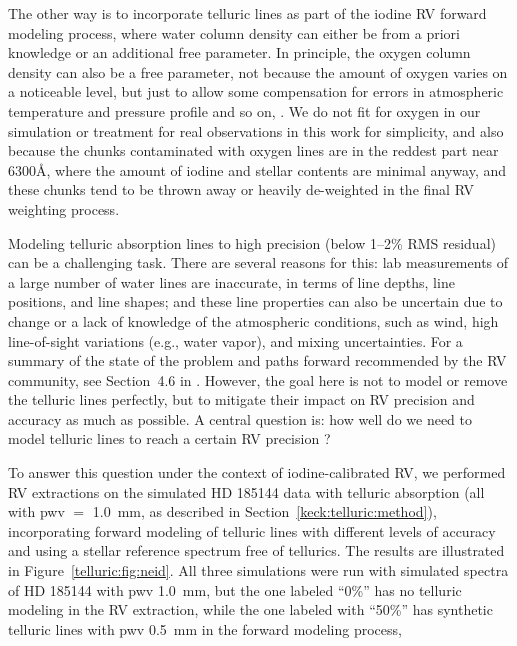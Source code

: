 The other way is to incorporate telluric lines as part of the iodine
RV forward modeling process, where water column density can either be
from a priori knowledge or an additional free parameter. In principle,
the oxygen column density can also be a free parameter, not because
the amount of oxygen varies on a noticeable level, but just to allow
some compensation for errors in atmospheric temperature and pressure
profile and so on, . We do not fit for oxygen in our simulation or treatment
for real observations in this work for simplicity, and also because
the chunks contaminated with oxygen lines are in the reddest part near
6300\AA, where the amount of iodine and stellar contents are minimal
anyway, and these chunks tend to be thrown away or heavily de-weighted
in the final RV weighting process.

Modeling telluric absorption lines to high precision (below 1--2\% RMS
residual) can be a challenging task. There are several reasons for
this: lab measurements of a large number of water lines are
inaccurate, in terms of line depths, line positions, and line shapes;
and these line properties can also be uncertain due to change or a
lack of knowledge of the atmospheric conditions, such as wind, high
line-of-sight variations (e.g., water vapor), and mixing
uncertainties. For a summary of the state of the problem and paths
forward recommended by the RV community, see Section~4.6 in
\cite{eprv2015}. However, the goal here is not to model or remove
the telluric lines perfectly, but to mitigate their impact on RV
precision and accuracy as much as possible. A central question is: how
well do we need to model telluric lines to reach a certain RV
precision \citep{eprv2015}?

To answer this question under the context of iodine-calibrated RV, we
performed RV extractions on the simulated HD 185144 data with telluric
absorption (all with pwv $=$ 1.0~mm, as described in
Section~\ref{keck:telluric:method}), incorporating forward modeling of
telluric lines with different levels of accuracy and using a stellar
reference spectrum free of tellurics. The results are illustrated in
Figure~\ref{telluric:fig:neid}. All three simulations were run with
simulated spectra of HD 185144 with pwv 1.0~mm, but the one labeled
``0\%'' has no telluric modeling in the RV extraction, while the one
labeled with ``50\%'' has synthetic telluric lines with pwv 0.5~mm in
the forward modeling process, 

